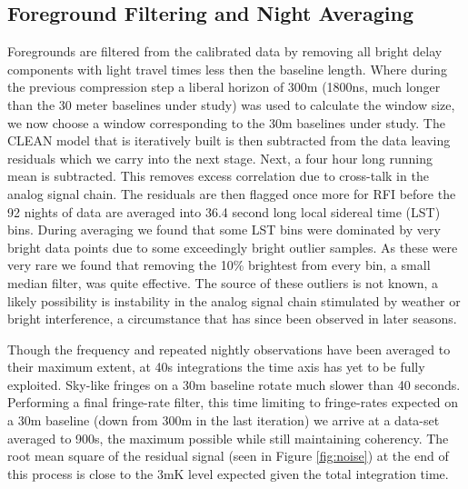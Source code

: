 \documentclass[preprint]{aastex}
\begin{document}
\subsection{Foreground Filtering and Night Averaging}
Foregrounds are filtered from the calibrated data by removing all bright delay components with light travel times less then the baseline length. Where during the previous compression step a liberal horizon of 300m (1800ns, much longer than the 30 meter baselines under study)  was used to calculate the window size, we now choose a window corresponding to the 30m baselines under study.  The CLEAN model that is iteratively built is then subtracted from the data leaving residuals which we carry into the next stage. Next, a four hour long running mean is subtracted. This removes excess correlation due to cross-talk in the analog signal chain. The residuals are then flagged once more for RFI before the 92 nights of data are averaged into 36.4 second long local sidereal time (LST) bins.  During averaging we found that some LST bins were dominated by very bright data points due to some exceedingly bright outlier samples. As these were very rare we found that removing the 10\% brightest from every bin, a small median filter, was quite effective.  The source of these outliers is not known,  a likely possibility is instability in the analog signal chain stimulated by weather or bright interference, a circumstance that has since been observed in later seasons. 


Though the frequency and repeated nightly observations have been averaged to their maximum extent, at 40s integrations the time axis has yet to be fully exploited.  Sky-like fringes on a 30m baseline rotate much slower than 40 seconds.  Performing a final fringe-rate filter, this time limiting to fringe-rates expected on a 30m baseline (down from 300m in the last iteration) we arrive at a data-set averaged to 900s, the maximum possible while still maintaining coherency.    The root mean square of the residual signal (seen in Figure \ref{fig:noise}) at the end of this process is close to the 3mK level expected given the total integration time.  


\end{document}

